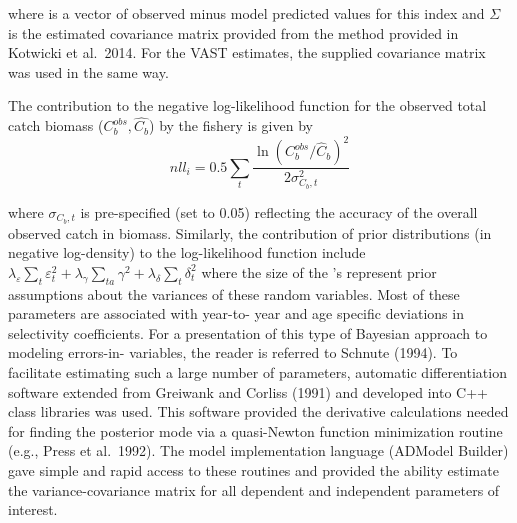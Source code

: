 \documentclass[11pt,
  english,
  a4paper,
]{article}
\begin{document}
\leavevmode\tagmcend\tagstructend\par


where is a vector of observed minus model predicted values for this index and {\(\Sigma\)\leavevmode\tagmcend\tagstructend} is the estimated covariance matrix provided from the method provided in Kotwicki et al.~2014. For the VAST estimates, the supplied covariance matrix was used in the same way.

\leavevmode\tagmcend\tagstructend\par


The contribution to the negative log-likelihood function for the observed total catch biomass ({\(C_b^{obs}, \hat{C_b}\)\leavevmode\tagmcend\tagstructend}) by the fishery is given by \begin{equation}
nll_i = 0.5\sum_t\frac{\ln(C_b^{obs}/\hat C_b)^2}{2\sigma_{C_b,t}^2}
\end{equation}

\leavevmode\tagmcend\tagstructend\par


where {\(\sigma_{C_b,t}\)\leavevmode\tagmcend\tagstructend} is pre-specified (set to 0.05) reflecting the accuracy of the overall observed catch in biomass. Similarly, the contribution of prior distributions (in negative log-density) to the log-likelihood function include {\(\lambda_\varepsilon \sum_t\varepsilon_t^2 +\lambda_\gamma \sum_{ta}\gamma^2 + \lambda_\delta \sum_t\delta_t^2\)\leavevmode\tagmcend\tagstructend} where the size of the 's represent prior assumptions about the variances of these random variables. Most of these parameters are associated with year-to- year and age specific deviations in selectivity coefficients. For a presentation of this type of Bayesian approach to modeling errors-in- variables, the reader is referred to Schnute (1994). To facilitate estimating such a large number of parameters, automatic differentiation software extended from Greiwank and Corliss (1991) and developed into C++ class libraries was used. This software provided the derivative calculations needed for finding the posterior mode via a quasi-Newton function minimization routine (e.g., Press et al.~1992). The model implementation language (ADModel Builder) gave simple and rapid access to these routines and provided the ability estimate the variance-covariance matrix for all dependent and independent parameters of interest.

\leavevmode\tagmcend\tagstructend\par
\end{document}
